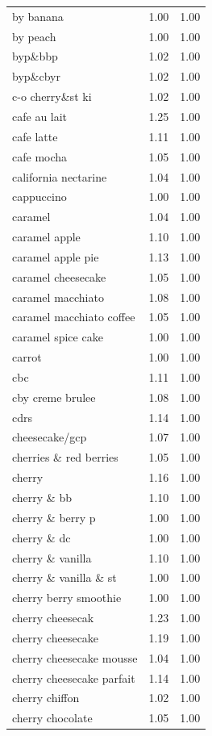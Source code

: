 \begin{table}
\begin{tabular}{lrr}
by banana & 1.00 & 1.00 \\
by peach & 1.00 & 1.00 \\
byp\&bbp & 1.02 & 1.00 \\
byp\&cbyr & 1.02 & 1.00 \\
c-o cherry\&st ki & 1.02 & 1.00 \\
cafe au lait & 1.25 & 1.00 \\
cafe latte & 1.11 & 1.00 \\
cafe mocha & 1.05 & 1.00 \\
california nectarine & 1.04 & 1.00 \\
cappuccino & 1.00 & 1.00 \\
caramel & 1.04 & 1.00 \\
caramel apple & 1.10 & 1.00 \\
caramel apple pie & 1.13 & 1.00 \\
caramel cheesecake & 1.05 & 1.00 \\
caramel macchiato & 1.08 & 1.00 \\
caramel macchiato coffee & 1.05 & 1.00 \\
caramel spice cake & 1.00 & 1.00 \\
carrot & 1.00 & 1.00 \\
cbc & 1.11 & 1.00 \\
cby creme brulee & 1.08 & 1.00 \\
cdrs & 1.14 & 1.00 \\
cheesecake/gcp & 1.07 & 1.00 \\
cherries \& red berries & 1.05 & 1.00 \\
cherry & 1.16 & 1.00 \\
cherry \& bb & 1.10 & 1.00 \\
cherry \& berry p & 1.00 & 1.00 \\
cherry \& dc & 1.00 & 1.00 \\
cherry \& vanilla & 1.10 & 1.00 \\
cherry \& vanilla \& st & 1.00 & 1.00 \\
cherry berry smoothie & 1.00 & 1.00 \\
cherry cheesecak & 1.23 & 1.00 \\
cherry cheesecake & 1.19 & 1.00 \\
cherry cheesecake mousse & 1.04 & 1.00 \\
cherry cheesecake parfait & 1.14 & 1.00 \\
cherry chiffon & 1.02 & 1.00 \\
cherry chocolate & 1.05 & 1.00 \\

\end{tabular}
\end{table}
